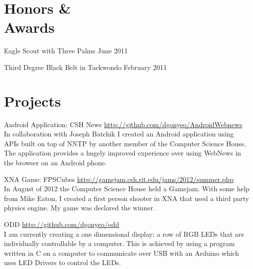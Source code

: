 \documentclass[letterpaper,margin,line,11pt]{resume}
\newcommand{\rurl}[1]{\hfill {\footnotesize \url{#1}}}
\begin{document}
\begin{resume}
\section{\mysidestyle Honors \& \\ Awards}
	\begin{asparablank}
		\item Eagle Scout with Three Palms \hfill June 2011
		\item Third Degree Black Belt in Taekwondo \hfill February 2011
	\end{asparablank}

\section{\mysidestyle Projects}
	\begin{compactdesc}
		\item[Android Application: CSH News] \rurl{http://github.com/dgonyeo/AndroidWebnews} \\
			In collaboration with Joseph Batchik I created an Android application using APIs built on top of NNTP by another member of the Computer Science House. The application provides a hugely improved experience over using WebNews in the browser on an Android phone.
                \item[XNA Game: FPSCubes] \rurl{http://gamejam.csh.rit.edu/jams/2012/summer.php} \\
			In August of 2012 the Computer Science House held a Gamejam. With some help from Mike Eaton, I created a first person shooter in XNA that used a third party physics engine. My game was declared the winner.
		\item[ODD] \rurl{http://github.com/dgonyeo/odd} \\
			I am currently creating a one dimensional display: a row of RGB LEDs that are individually controllable by a computer. This is achieved by using a program written in C on a computer to communicate over USB with an Arduino which uses LED Drivers to control the LEDs.
	\end{compactdesc}
\end{resume}
\end{document}
